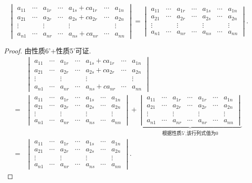 \[
  \begin{vmatrix}
    a_{11}&\cdots&a_{1r}&\cdots&a_{1s}+ca_{1r}&\cdots&a_{1n}\\
    a_{21}&\cdots&a_{2r}&\cdots&a_{2s}+ca_{2r}&\cdots&a_{2n}\\
    \vdots&&\vdots&&\vdots&&\vdots\\
    a_{n1}&\cdots&a_{nr}&\cdots&a_{ns}+ca_{nr}&\cdots&a_{nn}
  \end{vmatrix} =
  \begin{vmatrix}
    a_{11}&\cdots&a_{1r}&\cdots&a_{1s}&\cdots&a_{1n}\\
    a_{21}&\cdots&a_{2r}&\cdots&a_{2s}&\cdots&a_{2n}\\
    \vdots&&\vdots&&\vdots&&\vdots\\
    a_{n1}&\cdots&a_{nr}&\cdots&a_{ns}&\cdots&a_{nn}
  \end{vmatrix}.
\]

\begin{proof}
  由性质6'+性质5'可证.
  \begin{align*}
  & \begin{vmatrix}
    a_{11}&\cdots&a_{1r}&\cdots&a_{1s}+ca_{1r}&\cdots&a_{1n}\\
    a_{21}&\cdots&a_{2r}&\cdots&a_{2s}+ca_{2r}&\cdots&a_{2n}\\
    \vdots&&\vdots&&\vdots&&\vdots\\
    a_{n1}&\cdots&a_{nr}&\cdots&a_{ns}+ca_{nr}&\cdots&a_{nn}
  \end{vmatrix}\\
    = & 
  \begin{vmatrix}
    a_{11}&\cdots&a_{1r}&\cdots&a_{1s}&\cdots&a_{1n}\\
    a_{21}&\cdots&a_{2r}&\cdots&a_{2s}&\cdots&a_{2n}\\
    \vdots&&\vdots&&\vdots&&\vdots\\
    a_{n1}&\cdots&a_{nr}&\cdots&a_{ns}&\cdots&a_{nn}
  \end{vmatrix}+
  \underbrace{\begin{vmatrix}
    a_{11}&\cdots&a_{1r}&\cdots&a_{1r}&\cdots&a_{1n}\\
    a_{21}&\cdots&a_{2r}&\cdots&a_{2r}&\cdots&a_{2n}\\
    \vdots&&\vdots&&\vdots&&\vdots\\
    a_{n1}&\cdots&a_{nr}&\cdots&a_{nr}&\cdots&a_{nn}
  \end{vmatrix}}_{\text{根据性质5',该行列式值为$0$}}\\
    = &
  \begin{vmatrix}
    a_{11}&\cdots&a_{1r}&\cdots&a_{1s}&\cdots&a_{1n}\\
    a_{21}&\cdots&a_{2r}&\cdots&a_{2s}&\cdots&a_{2n}\\
    \vdots&&\vdots&&\vdots&&\vdots\\
    a_{n1}&\cdots&a_{nr}&\cdots&a_{ns}&\cdots&a_{nn}
  \end{vmatrix}.  
  \end{align*}
\end{proof}

